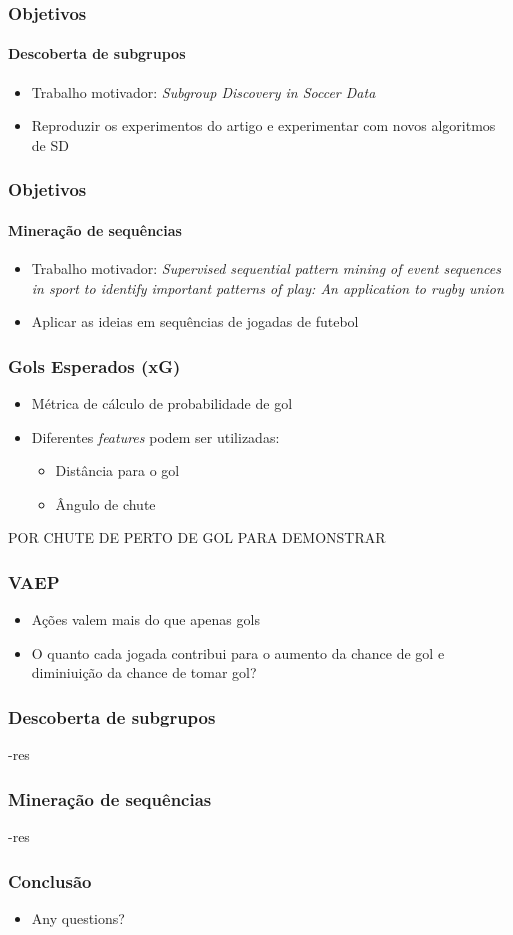 \documentclass{beamer}
\begin{document}
\begin{frame}
\frametitle{Objetivos}
\framesubtitle{Descoberta de subgrupos}
\begin{itemize}
    \item Trabalho motivador: \textit{Subgroup Discovery in Soccer Data}
    \item Reproduzir os experimentos do artigo e experimentar com novos algoritmos de SD
\end{itemize}
\end{frame}

\begin{frame}
\frametitle{Objetivos}
\framesubtitle{Mineração de sequências}
\begin{itemize}
    \item Trabalho motivador: \textit{Supervised sequential pattern mining of event sequences in sport to identify important patterns of play: An application to rugby union}
    \item Aplicar as ideias em sequências de jogadas de futebol
\end{itemize}
\end{frame}

\begin{frame}
\frametitle{Gols Esperados (xG)}
\begin{itemize}
    \item Métrica de cálculo de probabilidade de gol
    \item Diferentes \textit{features} podem ser utilizadas:
    \begin{itemize}
        \item Distância para o gol
        \item Ângulo de chute
    \end{itemize}
\end{itemize}
POR CHUTE DE PERTO DE GOL PARA DEMONSTRAR
\end{frame}

\begin{frame}
\frametitle{VAEP}
\begin{itemize}
    \item Ações valem mais do que apenas gols
    \item O quanto cada jogada contribui para o aumento da chance de gol e diminiuição da chance de tomar gol?
\end{itemize}
\end{frame}

\begin{frame}
\frametitle{Descoberta de subgrupos}
-res
\end{frame}

\begin{frame}
\frametitle{Mineração de sequências}
-res
\end{frame}

\begin{frame}
\frametitle{Conclusão}
\begin{itemize}
    \item Any questions?
\end{itemize}
\end{frame}
\end{document}
